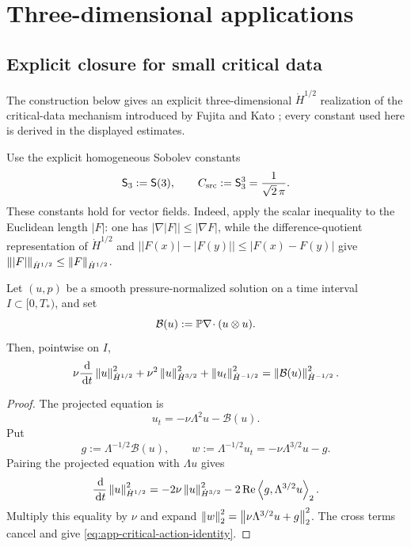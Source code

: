 \section{Three-dimensional applications}
\label{sec:three-dimensional-applications}

\subsection{Explicit closure for small critical data}

The construction below gives an explicit three-dimensional
\(\dot H^{1/2}\) realization of the critical-data mechanism introduced by
Fujita and Kato \cite{FujitaKato1964}; every constant used here is derived
in the displayed estimates.

Use the explicit homogeneous Sobolev constants
\[
 \mathsf S_3:=\mathsf S(3),
 \qquad
 C_{\rm src}:=\mathsf S_3^3=\frac1{\sqrt2\,\pi}.
\]
These constants hold for vector fields.  Indeed, apply the scalar
inequality to the Euclidean length \(|F|\): one has
\(|\nabla|F||\le|\nabla F|\), while the difference-quotient representation of
\(\dot H^{1/2}\) and
\(\bigl||F(x)|-|F(y)|\bigr|\le|F(x)-F(y)|\) give
\(\left\lVert |F|\right\rVert_{\dot H^{1/2}}\le\left\lVert F\right\rVert_{\dot H^{1/2}}\).

\begin{lemma}
\label{lem:app-critical-action-identity}
Let \((u,p)\) be a smooth pressure-normalized solution on a time interval
\(I\subset[0,T_*)\), and set
\[
 \mathcal B(u):=\mathbb P\nabla\!\cdot(u\otimes u).
\]
Then, pointwise on \(I\),
\begin{equation}
 \nu\frac{\,\mathrm d}{\,\mathrm d t}\left\lVert u\right\rVert_{\dot H^{1/2}}^2
 +\nu^2\left\lVert u\right\rVert_{\dot H^{3/2}}^2
 +\left\lVert u_t\right\rVert_{\dot H^{-1/2}}^2
 =\left\lVert \mathcal B(u)\right\rVert_{\dot H^{-1/2}}^2.
 \label{eq:app-critical-action-identity}
\end{equation}
\end{lemma}

\begin{proof}
The projected equation is
\[
 u_t=-\nu\Lambda^2u-\mathcal B(u).
\]
Put
\[
 g:=\Lambda^{-1/2}\mathcal B(u),
 \qquad
 w:=\Lambda^{-1/2}u_t=-\nu\Lambda^{3/2}u-g.
\]
Pairing the projected equation with \(\Lambda u\) gives
\[
 \frac{\,\mathrm d}{\,\mathrm d t}\left\lVert u\right\rVert_{\dot H^{1/2}}^2
 =-2\nu\left\lVert u\right\rVert_{\dot H^{3/2}}^2
  -2\operatorname{Re}\left\langle g,\Lambda^{3/2}u\right\rangle_2.
\]
Multiply this equality by \(\nu\) and expand
\(\left\lVert w\right\rVert_2^2=\left\lVert \nu\Lambda^{3/2}u+g\right\rVert_2^2\).
The cross terms cancel and give
\eqref{eq:app-critical-action-identity}.
\end{proof}

